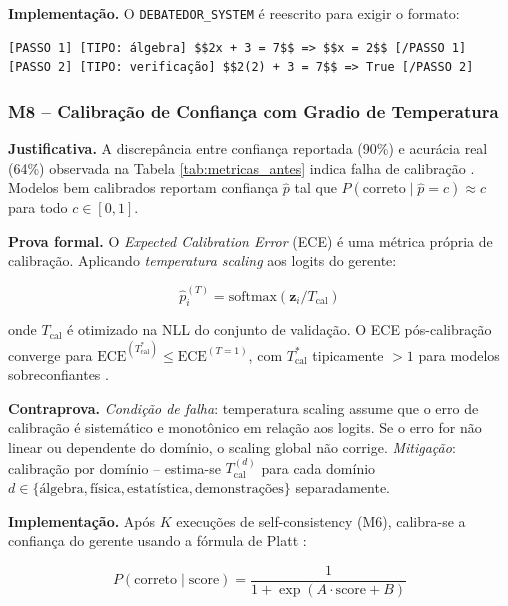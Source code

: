 \documentclass[5p]{elsarticle}
\theoremstyle{remark}
\begin{document}
\textbf{Implementação.} O \texttt{DEBATEDOR\_SYSTEM} é reescrito para exigir o formato:

\begin{verbatim}
[PASSO 1] [TIPO: álgebra] $$2x + 3 = 7$$ => $$x = 2$$ [/PASSO 1]
[PASSO 2] [TIPO: verificação] $$2(2) + 3 = 7$$ => True [/PASSO 2]
\end{verbatim}

\subsubsection{M8 -- Calibração de Confiança com Gradio de Temperatura}

\textbf{Justificativa.} A discrepância entre confiança reportada (90\%) e acurácia real (64\%) observada na Tabela \ref{tab:metricas_antes} indica falha de calibração \cite{Guo2017Calibration}. Modelos bem calibrados reportam confiança $\hat{p}$ tal que $P(\text{correto} \mid \hat{p} = c) \approx c$ para todo $c \in [0, 1]$.

\textbf{Prova formal.} O \textit{Expected Calibration Error} (ECE) é uma métrica própria de calibração. Aplicando \textit{temperatura scaling} \cite{Guo2017Calibration} aos logits do gerente:

\begin{equation}
\hat{p}_i^{(T)} = \text{softmax}(\mathbf{z}_i / T_{\text{cal}})
\label{eq:m8_temperature_scaling}
\end{equation}

onde $T_{\text{cal}}$ é otimizado na NLL do conjunto de validação. O ECE pós-calibração converge para $\text{ECE}^{(T_{\text{cal}}^*)} \leq \text{ECE}^{(T=1)}$, com $T_{\text{cal}}^*$ tipicamente $> 1$ para modelos sobreconfiantes \cite{Guo2017Calibration}.

\textbf{Contraprova.} \textit{Condição de falha}: temperatura scaling assume que o erro de calibração é sistemático e monotônico em relação aos logits. Se o erro for não linear ou dependente do domínio, o scaling global não corrige. \textit{Mitigação}: calibração por domínio -- estima-se $T_{\text{cal}}^{(d)}$ para cada domínio $d \in \{\text{álgebra}, \text{física}, \text{estatística}, \text{demonstrações}\}$ separadamente.

\textbf{Implementação.} Após $K$ execuções de self-consistency (M6), calibra-se a confiança do gerente usando a fórmula de Platt \cite{Platt1999Probabilistic}:

\begin{equation}
P(\text{correto} \mid \text{score}) = \frac{1}{1 + \exp(A \cdot \text{score} + B)}
\label{eq:m8_platt}
\end{equation}
\end{document}
